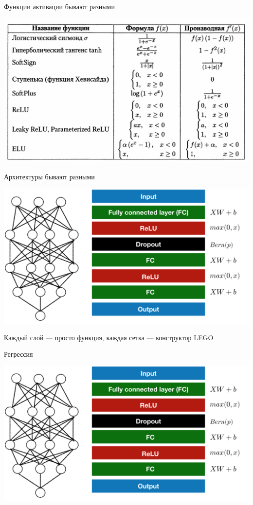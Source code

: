 \documentclass[notes,12pt, aspectratio=169]{beamer}
\begin{document}
\begin{frame}{Функции активации бывают разными}
\begin{center}
	\includegraphics[width=0.7\paperwidth]{activations.png}
\end{center}
\end{frame}


\begin{frame}{Архитектуры бывают разными}
	\begin{center}
		\includegraphics[width=0.75\paperwidth]{nn_lego_1.png}
	\end{center}
	Каждый слой — просто функция, каждая сетка — конструктор LEGO
\end{frame}


\begin{frame}{Регрессия}
\begin{center}
	\includegraphics[width=0.75\paperwidth]{nn_lego_1.png}
\end{center}
\end{frame}
\end{document}

